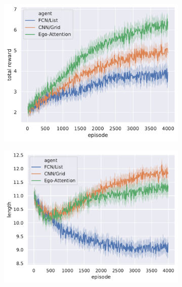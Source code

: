 \begin{figure}[htp]
	\centering
	\begin{subfigure}[b]{0.6\linewidth}
		\includegraphics[width=\linewidth]{img/total_reward}
	\end{subfigure}
	\begin{subfigure}[b]{0.49\linewidth}
		\includegraphics[width=\linewidth]{img/length}
	\end{subfigure}
	\begin{subfigure}[b]{0.49\linewidth}

\end{subfigure}
\end{figure}

